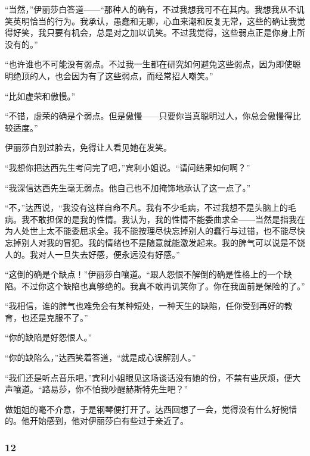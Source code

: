 \par “当然，”伊丽莎白答道——“那种人的确有，不过我想我可不在其内。我想我从不讥笑英明恰当的行为。我承认，愚蠢和无聊，心血来潮和反复无常，这些的确让我觉得好笑，我只要有机会，总是对之加以讥笑。不过我觉得，这些弱点正是你身上所没有的。”
\par “也许谁也不可能没有弱点。不过我一生都在研究如何避免这些弱点，因为即使聪明绝顶的人，也会因为有了这些弱点，而经常招人嘲笑。”
\par “比如虚荣和傲慢。”
\par “不错，虚荣的确是个弱点。但是傲慢——只要你当真聪明过人，你总会傲慢得比较适度。”
\par 伊丽莎白别过脸去，免得让人看见她在发笑。
\par “我想你把达西先生考问完了吧，”宾利小姐说。“请问结果如何啊？”
\par “我深信达西先生毫无弱点。他自己也不加掩饰地承认了这一点了。”
\par “不，”达西说，“我没有这样自命不凡。我有不少毛病，不过我想不是头脑上的毛病。我不敢担保的是我的性情。我认为，我的性情不能委曲求全——当然是指我在为人处世上太不能委屈求全。我不能按理尽快忘掉别人的蠢行与过错，也不能尽快忘掉别人对我的冒犯。我的情绪也不是随意就能激发起来。我的脾气可以说是不饶人的。我对人一旦失去好感，便永远没有好感。”
\par “这倒的确是个缺点！”伊丽莎白嚷道。“跟人怨恨不解倒的确是性格上的一个缺陷。不过你这个缺陷也真够绝的。我真不敢再讥笑你了。你在我面前是保险的了。”
\par “我相信，谁的脾气也难免会有某种短处，一种天生的缺陷，任你受到再好的教育，也还是克服不了。”
\par “你的缺陷是好怨恨人。”
\par “你的缺陷么，”达西笑着答道，“就是成心误解别人。”
\par “我们还是听点音乐吧，”宾利小姐眼见这场谈话没有她的份，不禁有些厌烦，便大声嚷道。“路易莎，你不怕我吵醒赫斯特先生吧？”
\par 做姐姐的毫不介意，于是钢琴便打开了。达西回想了一会，觉得没有什么好惋惜的。他开始感到，他对伊丽莎白有些过于亲近了。


\subsubsection*{12}


